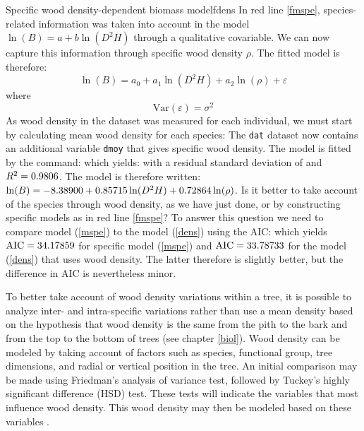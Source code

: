 \begin{filrouge}{Specific wood density-dependent biomass model}{fdens}%
In red line \ref{fmspe}, species-related information was taken into account in the model $\ln(B)=a+b\ln(D^2H)$ through a qualitative covariable. We can now capture this information through specific wood density $\rho$. The fitted model is therefore:
\begin{equation}
\ln(B)=a_0+a_1\ln(D^2H)+a_2\ln(\rho)+\varepsilon\label{dens}
\end{equation}
where
\[
\mathrm{Var}(\varepsilon)=\sigma^2
\]
As wood density in the dataset was measured for each individual, we must start by calculating mean wood density for each species:
%
The \texttt{dat} dataset now contains an additional variable \texttt{dmoy} that gives specific wood density. The model is fitted by the command:
%
which yields:
%
with a residual standard deviation of  and $R^2=\mbox{0.9806}$. The model is therefore written:
$\ln(B)=-\mbox{8.38900}+\mbox{0.85715}\ln(D^2H)+\mbox{0.72864}\ln(\rho)$.
Is it better to take account of the species through wood density, as we have just done, or by constructing specific models as in red line \ref{fmspe}? To answer this question we need to compare model (\ref{mspe}) to the model (\ref{dens}) using the AIC:
%
which yields $\mathrm{AIC}=\mbox{34.17859}$ for specific model (\ref{mspe}) and $\mathrm{AIC}=\mbox{33.78733}$ for the model (\ref{dens}) that uses wood density. The latter therefore is slightly better, but the difference in AIC is nevertheless minor.
\end{filrouge}

To better take account of wood density variations within a tree, it is possible to analyze inter- and intra-specific variations rather than use a mean density based on the hypothesis that wood density is the same from the pith to the bark and from the top to the bottom of trees (see chapter \ref{biol}). Wood density can be modeled by taking account of factors such as species, functional group, tree dimensions, and radial or vertical position in the tree. An initial comparison may be made using Friedman's analysis of variance test, followed by Tuckey's highly significant difference (HSD) test. These tests will indicate the variables that most influence wood density. This wood density may then be modeled based on these variables \citep{henry10}.

